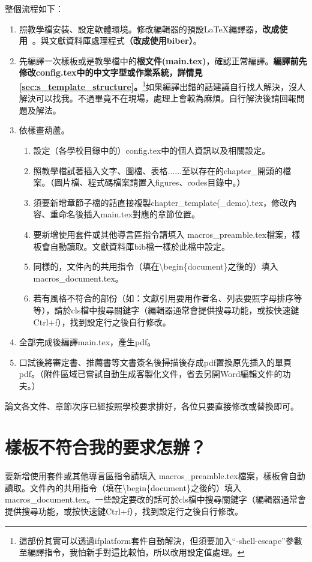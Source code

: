 \documentclass[class=NCU_thesis, crop=false, float=true]{standalone}
\begin{document}
整個流程如下：
\begin{enumerate}
    \item 照教學檔安裝、設定軟體環境。修改編輯器的預設LaTeX編譯器，\textbf{改成使用\XeLaTeX\ }。與文獻資料庫處理程式\textbf{（改成使用biber）}。
    \item 先編譯一次樣板或是教學檔中的\textbf{根文件(main.tex)}，確認正常編譯。\textbf{編譯前先修改config.tex中的中文字型或作業系統，詳情見\cref{sec:s_template_structure}。}\footnote{這部份其實可以透過ifplatform套件自動解決，但須要加入``-shell-escape''參數至編譯指令，我怕新手對這比較怕，所以改用設定值處理。}如果編譯出錯的話建議自行找人解決，沒人解決可以找我。不過畢竟不在現場，處理上會較為麻煩。自行解決後請回報問題及解法。
    \item 依樣畫葫蘆。
    \begin{enumerate}
        \item 設定（各學校目錄中的）config.tex中的個人資訊以及相關設定。
        \item 照教學檔試著插入文字、圖檔、表格......至以存在的chapter\_開頭的檔案。（圖片檔、程式碼檔案請置入figures、codes目錄中。）
        \item 須要新增章節子檔的話直接複製chapter\_template(\_demo).tex，修改內容、重命名後插入main.tex對應的章節位置。
        \item 要新增使用套件或其他導言區指令請填入 macros\_preamble.tex檔案，樣板會自動讀取。文獻資料庫bib檔一樣於此檔中設定。
        \item 同樣的，文件內的共用指令（填在\textbackslash{}begin\{document\}之後的）填入macros\_document.tex。
        \item 若有風格不符合的部份（如：文獻引用要用作者名、列表要照字母排序等等），請於cls檔中搜尋關鍵字（編輯器通常會提供搜尋功能，或按快速鍵Ctrl+f），找到設定行之後自行修改。
    \end{enumerate}
    \item 全部完成後編譯main.tex，產生pdf。
    \item 口試後將審定書、推薦書等文書簽名後掃描後存成pdf置換原先插入的單頁pdf。（附件區域已嘗試自動生成客製化文件，省去另開Word編輯文件的功夫。）
\end{enumerate}
論文各文件、章節次序已經按照學校要求排好，各位只要直接修改或替換即可。

\section{樣板不符合我的要求怎辦？}
要新增使用套件或其他導言區指令請填入 macros\_preamble.tex檔案，樣板會自動讀取。文件內的共用指令（填在\textbackslash{}begin\{document\}之後的）填入macros\_document.tex。一些設定要改的話可於cls檔中搜尋關鍵字（編輯器通常會提供搜尋功能，或按快速鍵Ctrl+f），找到設定行之後自行修改。
\end{document}

